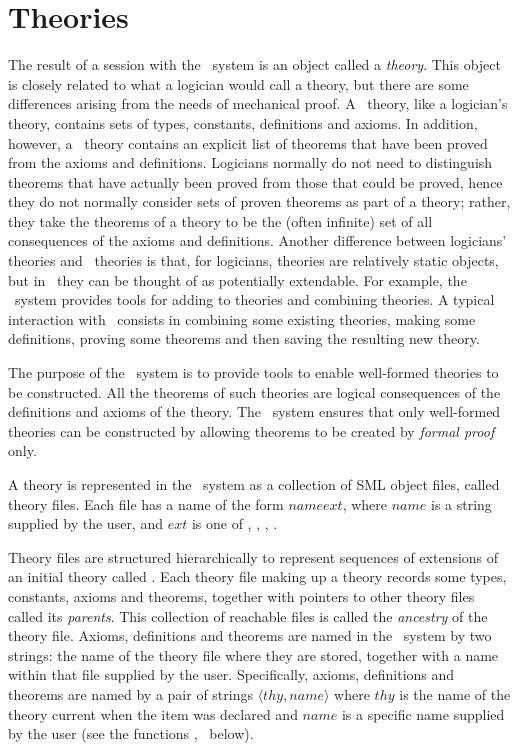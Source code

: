 \section{Theories}
\label{theories}

The result of a session with the \HOL\ system is an object called a
{\it theory\/}.  This object is closely related to what a logician
would call a theory, but there are some differences arising from the
needs of mechanical proof.  A \HOL\ theory, like a logician's theory,
contains sets of types, constants, definitions and axioms.  In
addition, however, a \HOL\ theory contains an explicit list of
theorems that have been proved from the axioms and definitions.
Logicians normally do not need to distinguish theorems that have
actually been proved from those that could be proved, hence they do
not normally consider sets of proven theorems as part of a theory;
rather, they take the theorems of a theory to be the (often infinite)
set of all consequences of the axioms and definitions.  Another
difference between logicians' theories and \HOL\ theories is that, for
logicians, theories are relatively static objects, but in \HOL\ they
can be thought of as potentially extendable. For example, the \HOL\
system provides tools for adding to theories and combining theories.
A typical interaction with \HOL\ consists in combining some existing
theories, making some definitions, proving some theorems and then
saving the resulting new theory.

The purpose of the \HOL\ system is to provide tools to enable
well-formed theories to be constructed.  All the theorems of such
theories are logical consequences of the definitions and axioms of the
theory.  The \HOL\ system ensures that only well-formed theories can
be constructed by allowing theorems to be created by {\it formal
  proof\/} only.

A theory is represented in the \HOL\ system as a collection of SML
object files, called theory files.  Each file has a name of the form
$name$\ml{Theory.}$ext$, where $name$ is a string supplied by the
user, and $ext$ is one of \ml{sig}, \ml{sml}, \ml{ui}, \ml{uo}.

Theory files are structured hierarchically to represent sequences of
extensions of an initial theory called \ml{scratch}.  Each theory file
making up a theory records some types, constants, axioms and theorems,
together with pointers to other theory files called its {\it
  parents\/}.  This collection of reachable files is called the {\it
  ancestry\/} of the theory file. Axioms, definitions and theorems are
named in the \HOL\ system by two strings: the name of the theory file
where they are stored, together with a name within that file supplied
by the user.  Specifically, axioms, definitions and theorems are named
by a pair of strings $\langle thy,name\rangle$ where $thy$ is the name
of the theory current when the item was declared and $name$ is a
specific name supplied by the user (see the functions ,
\ml{new\_definition} \etc\ below).


